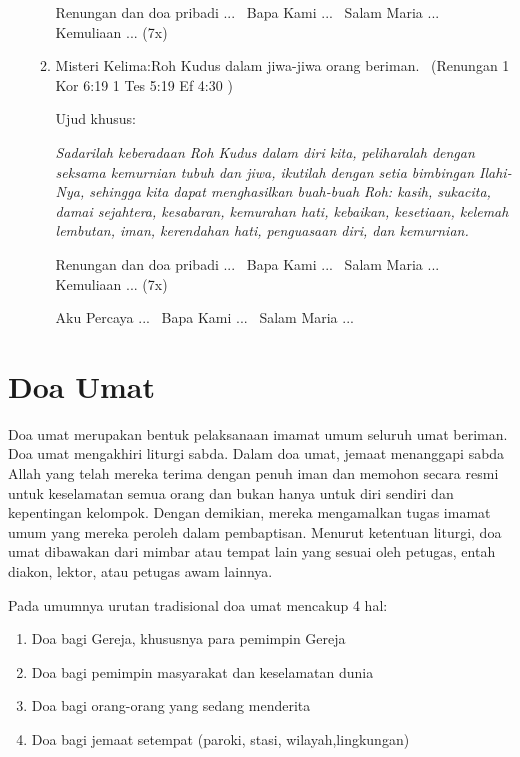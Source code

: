 \begin{enumerate}
\begin{enumerate}
Renungan dan doa pribadi ...~ Bapa Kami ...~ Salam Maria ...~ Kemuliaan
... (7x)

\item Misteri Kelima:{\textquotedbl}Roh Kudus dalam jiwa-jiwa orang
beriman.{\textquotedbl}~ (Renungan 1 Kor 6:19 1 Tes 5:19 Ef 4:30 )

Ujud khusus:~

\textit{Sadarilah keberadaan Roh Kudus dalam diri kita, peliharalah dengan
seksama kemurnian tubuh dan jiwa, ikutilah dengan setia bimbingan
Ilahi-Nya, sehingga kita dapat menghasilkan buah-buah Roh: kasih,
sukacita, damai sejahtera, kesabaran, kemurahan hati, kebaikan,
kesetiaan, kelemah lembutan, iman, kerendahan hati, penguasaan diri,
dan kemurnian.}

Renungan dan doa pribadi ...~ Bapa Kami ...~ Salam Maria ...~ Kemuliaan
... (7x)~  

Aku Percaya ...~ Bapa Kami ...~ Salam Maria ...
\end{enumerate}
\end{enumerate}

\section{Doa Umat}
Doa umat merupakan bentuk pelaksanaan imamat umum seluruh umat beriman. Doa umat mengakhiri liturgi sabda. Dalam doa umat, jemaat menanggapi sabda Allah yang telah mereka terima dengan penuh iman dan memohon secara resmi untuk keselamatan semua orang dan bukan hanya untuk diri sendiri dan kepentingan kelompok. Dengan demikian, mereka mengamalkan tugas imamat umum yang mereka peroleh dalam pembaptisan. Menurut ketentuan liturgi, doa umat dibawakan dari mimbar atau tempat lain yang sesuai oleh petugas, entah diakon, lektor, atau petugas awam lainnya. 
 
Pada umumnya urutan tradisional doa umat mencakup 4 hal:
\begin{enumerate}
\item  Doa bagi Gereja, khususnya para pemimpin Gereja
\item Doa bagi pemimpin masyarakat dan keselamatan dunia
\item Doa bagi orang-orang yang sedang menderita
\item Doa bagi jemaat setempat (paroki, stasi, wilayah,lingkungan)
\end{enumerate} 
 
